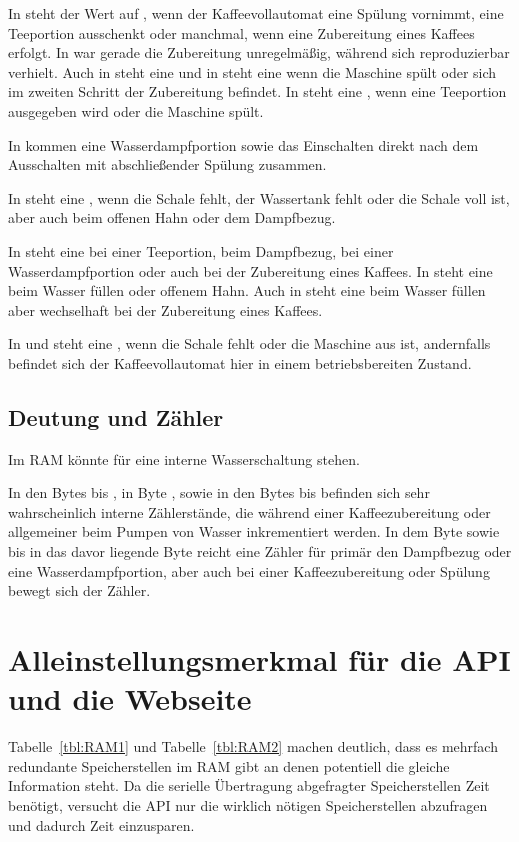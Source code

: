 In  steht der Wert auf , wenn der Kaffeevollautomat eine Spülung vornimmt, eine Teeportion ausschenkt oder manchmal, wenn eine Zubereitung eines Kaffees erfolgt.
In  war gerade die Zubereitung unregelmäßig, während sich  reproduzierbar verhielt.
Auch in  steht eine  und in  steht eine  wenn die Maschine spült oder sich im zweiten Schritt der Zubereitung befindet.
In  steht eine , wenn eine Teeportion ausgegeben wird oder die Maschine spült.

In  kommen eine Wasserdampfportion sowie das Einschalten direkt nach dem Ausschalten mit abschließender Spülung zusammen.

In  steht eine , wenn die Schale fehlt, der Wassertank fehlt oder die Schale voll ist, aber auch beim offenen Hahn oder dem Dampfbezug.

In  steht eine  bei einer Teeportion, beim Dampfbezug, bei einer Wasserdampfportion oder auch bei der Zubereitung eines Kaffees.
In  steht eine  beim Wasser füllen oder offenem Hahn.
Auch in  steht eine  beim Wasser füllen aber wechselhaft bei der Zubereitung eines Kaffees.

In  und  steht eine , wenn die Schale fehlt oder die Maschine aus ist, andernfalls befindet sich der Kaffeevollautomat hier in einem betriebsbereiten Zustand.

\subsection{Deutung und Zähler}
Im \ac{RAM} könnte  für eine interne Wasserschaltung stehen.

In den Bytes  bis , in Byte , sowie in den Bytes  bis  befinden sich sehr wahrscheinlich interne Zählerstände, die während einer Kaffeezubereitung oder allgemeiner beim Pumpen von Wasser inkrementiert werden.
In dem Byte  sowie bis in das davor liegende Byte  reicht eine Zähler für primär den Dampfbezug oder eine Wasserdampfportion, aber auch bei einer Kaffeezubereitung oder Spülung bewegt sich der Zähler.

\section{Alleinstellungsmerkmal für die API und die Webseite}
Tabelle~\ref{tbl:RAM1} und Tabelle~\ref{tbl:RAM2} machen deutlich, dass es mehrfach redundante Speicherstellen im \ac{RAM} gibt an denen potentiell die gleiche Information steht.
Da die serielle Übertragung abgefragter Speicherstellen Zeit benötigt, versucht die \ac{API} nur die wirklich nötigen Speicherstellen abzufragen und dadurch Zeit einzusparen.


